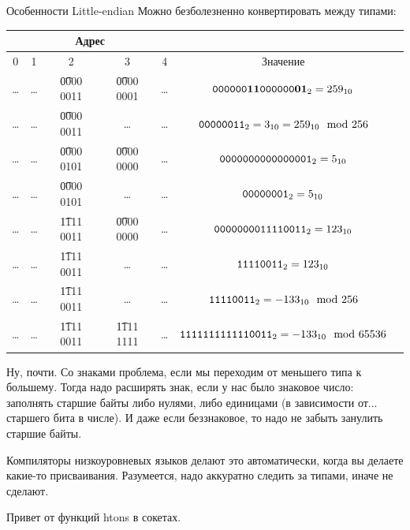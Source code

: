 \begin{frame}{Особенности Little-endian}
	Можно безболезненно конвертировать между типами:
	\begin{center}
		\begin{tabular}{|c|c|c|c|c|c|c|}
			\hline
			\multicolumn{5}{|c|}{Адрес} & \\\hline
			0 & 1 & 2 & 3 & 4 & Значение \\\hline
			\dots & \dots & \t{0000 0011} & \t{0000 0001} & \dots & $\t{0000 00\textbf{11} 0000 00\textbf{01}}_2=259_{10}$ \\\hline
			\dots & \dots & \t{0000 0011} & \dots & \dots & $\t{0000 0011}_2=3_{10}=259_{10} \mod 256$ \\\hline
			\dots & \dots & \t{0000 0101} & \t{0000 0000} & \dots & $\t{0000 0000 0000 0001}_2=5_{10}$ \\\hline
			\dots & \dots & \t{0000 0101} & \dots & \dots & $\t{0000 0001}_2=5_{10}$ \\\hline
			\dots & \dots & \t{1111 0011} & \t{0000 0000} & \dots & $\t{0000 0000 1111 0011}_2=123_{10}$ \\\hline
			\dots & \dots & \t{1111 0011} & \dots & \dots & $\t{1111 0011}_2=123_{10}$ \\\hline
			\dots & \dots & \t{1111 0011} & \dots & \dots & $\t{1111 0011}_2=-133_{10} \mod 256$ \\\hline
			\dots & \dots & \t{1111 0011} & \t{1111 1111} & \dots & $\t{1111 1111 1111 0011}_2=-133_{10} \mod 65536$ \\\hline
		\end{tabular}
	\end{center}
	Ну, почти.
	Со знаками проблема, если мы переходим от меньшего типа к большему.
	Тогда надо расширять знак, если у нас было знаковое число: заполнять старшие байты либо нулями, либо единицами (в зависимости от... \pause старшего бита в числе).
	И даже если беззнаковое, то надо не забыть занулить старшие байты.

	Компиляторы низкоуровневых языков делают это автоматически, когда вы делаете какие-то присваивания.
	Разумеется, надо аккуратно следить за типами, иначе не сделают.

	Привет от функций htons в сокетах.
\end{frame}

